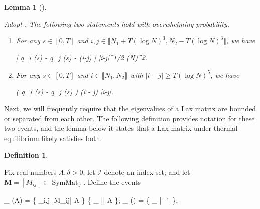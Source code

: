 \documentclass{amsart}
\numberwithin{equation}{section}
\DeclareMathOperator{\eig}{eig}
\DeclareMathOperator{\SymMat}{SymMat}
\DeclareMathOperator{\sgn}{sgn}
\newtheorem{lem}[thm]{Lemma}
\theoremstyle{remark}
\theoremstyle{definition}
\newtheorem{definition}[thm]{Definition}
\begin{document}
	\begin{lem}[{\cite[Lemma 7.2]{LC}}]
	
		\label{qijsalpha} 
		
		Adopt . The following two statements hold with overwhelming probability. 
		
		
		\begin{enumerate} 
			
			\item For any $s \in [0,T]$ and $i, j \in \llbracket N_1 + T(\log N)^3, N_2 - T (\log N)^3 \rrbracket$, we have
			\begin{flalign}
				\label{qiqjs4}
				\big| q_i (s) - q_j (s) - \alpha (i-j) \big| \le |i-j|^{1/2} (\log N)^2.
			\end{flalign}
			
			\item For any $s \in [0,T]$ and $i \in \llbracket N_1, N_2 \rrbracket$ with $|i-j| \ge T (\log N)^5$, we have 
			\begin{flalign}
				\label{qiqjs5}
				\big(  q_i (s) - q_j (s) \big) \cdot \sgn (\alpha i - \alpha j) \ge \displaystyle{} \cdot |i-j|.
			\end{flalign}
			
		\end{enumerate} 
		
	\end{lem} 	
	
	Next, we will frequently require that the eigenvalues of a Lax matrix are bounded or separated from each other. The following definition provides notation for these two events, and the lemma below it states that a Lax matrix under thermal equilibrium likely satisfies both. 
	
	\begin{definition}
		\label{adelta}
		
		Fix real numbers $A, \delta > 0$; let $\mathscr{I}$ denote an index set; and let $\bm{M} = [M_{ij}] \in \SymMat_{\mathscr{I}}$. Define the events
		\begin{flalign*}
			_{} (A) = \Bigg\{ \displaystyle\max_{i,j \in {}} |M_{ij}| \le A \Bigg\} \cap \Bigg\{ \displaystyle\max_{\lambda \in \eig {}} |\lambda| \le A \Bigg\}; \quad {}_{} (\delta) = \Bigg\{ \displaystyle\min_{\substack{\nu, \nu' \in \eig \bm{M} \\ \nu \ne \nu'}} |\nu - \nu'| \ge \delta \Bigg\}. 
		\end{flalign*}
	\end{definition} 
	
\end{document}
